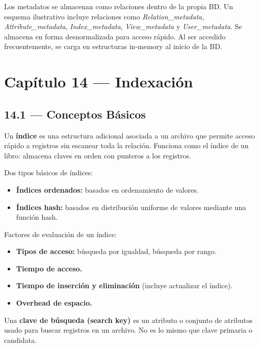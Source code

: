 \documentclass[11pt, a4paper]{article}
\begin{document}
Los metadatos se almacenan como relaciones dentro de la propia BD. Un esquema ilustrativo incluye relaciones como \textit{Relation\_metadata}, \textit{Attribute\_metadata}, \textit{Index\_metadata}, \textit{View\_metadata} y \textit{User\_metadata}. Se almacena en forma desnormalizada para acceso rápido. Al ser accedido frecuentemente, se carga en estructuras in-memory al inicio de la BD.

\section{Capítulo 14 --- Indexación}

\subsection{14.1 --- Conceptos Básicos}

Un \textbf{índice} es una estructura adicional asociada a un archivo que permite acceso rápido a registros sin escanear toda la relación. Funciona como el índice de un libro: almacena claves en orden con punteros a los registros.

Dos tipos básicos de índices:
\begin{itemize}[nosep]
	\item \textbf{Índices ordenados:} basados en ordenamiento de valores.
	\item \textbf{Índices hash:} basados en distribución uniforme de valores mediante una función hash.
\end{itemize}

Factores de evaluación de un índice:
\begin{itemize}[nosep]
	\item \textbf{Tipos de acceso:} búsqueda por igualdad, búsqueda por rango.
	\item \textbf{Tiempo de acceso.}
	\item \textbf{Tiempo de inserción y eliminación} (incluye actualizar el índice).
	\item \textbf{Overhead de espacio.}
\end{itemize}

Una \textbf{clave de búsqueda (search key)} es un atributo o conjunto de atributos usado para buscar registros en un archivo. No es lo mismo que clave primaria o candidata.
\end{document}
